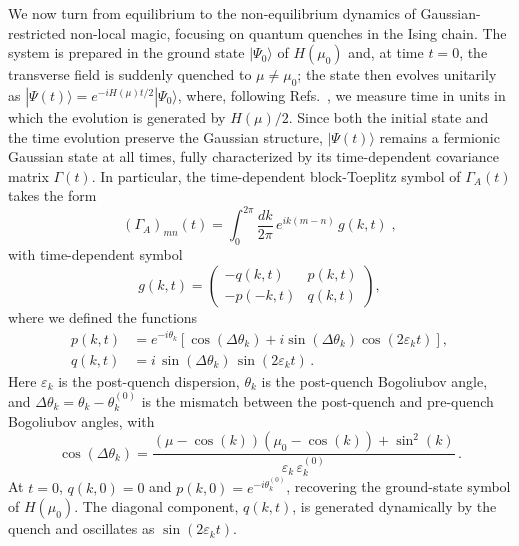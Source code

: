 \documentclass[prx,twocolumn,superscriptaddress,aps,10pt, frontmatterverbose, reprint,footinbib,longbibliography=true]{revtex4-2}
\providecommand{\DIFaddtex}[1]{{\protect\color{red}#1}} %
\providecommand{\DIFaddbegin}{\protect\color{red}} %
\providecommand{\DIFaddend}{\protect\color{black}} %
\providecommand{\DIFaddtex}[1]{\texorpdfstring{\DIFaddtex{#1}}{#1}} %
\providecommand{\DIFadd}[1]{\texorpdfstring{\DIFaddtex{#1}}{#1}} %
\newcommand{\DIFaddincludegraphics}[2][]{{\color{blue}\fbox{\DIFOincludegraphics[#1]{#2}}}} %
\DeclareRobustCommand{\DIFaddbegin}{\DIFOaddbegin \let\includegraphics\DIFaddincludegraphics} %
\DeclareRobustCommand{\DIFaddend}{\DIFOaddend \let\includegraphics\DIFOincludegraphics} %
\begin{document}
We now turn from equilibrium to the non-equilibrium dynamics of Gaussian-restricted non-local magic, focusing on quantum quenches in the Ising chain.
The system is prepared in the ground state $|\Psi_0\rangle$ of $H(\mu_0)$ and, at time $t=0$, the transverse field is suddenly quenched to $\mu \neq \mu_0$; the state then evolves unitarily as \DIFaddbegin \DIFadd{$|\Psi(t)\rangle = e^{-iH(\mu)t/2}|\Psi_0\rangle$, where, following Refs.~\cite{Calabrese2005evolution,Fagotti2008}, we measure time in units in which the evolution is generated by $H(\mu)/2$}\DIFaddend .
Since both the initial state and the time evolution preserve the Gaussian structure, $|\Psi(t)\rangle$ remains a fermionic Gaussian state at all times, fully characterized by its time-dependent covariance matrix $\Gamma(t)$.
In particular, the time-dependent block-Toeplitz symbol of $\Gamma_A(t)$ takes the form~\cite{Calabrese2005evolution}
\begin{equation}
    (\Gamma_A)_{mn}(t) = \int_0^{2\pi}\!\frac{dk}{2\pi}\,e^{ik(m-n)}\,g(k,t)\;,\label{eq:mustang}
\end{equation}
with time-dependent symbol
\begin{equation}
    g(k,t) = \begin{pmatrix} -q(k,t) & p(k,t) \\ -p(-k,t) & q(k,t) \end{pmatrix},
    \label{eq:symbol_t}
\end{equation}
where we defined the functions
\begin{equation}
\begin{split}
    p(k,t) &= e^{-i\theta_k}\left[\cos(\Delta\theta_k) + i\sin(\Delta\theta_k)\cos (2\varepsilon_k t) \right], \\
    q(k,t) &= i\,\sin(\Delta\theta_k)\,\sin (2\varepsilon_k t)\,.
    \label{eq:pq_symbol}
\end{split}
\end{equation}
Here $\varepsilon_k $ is the post-quench dispersion, $\theta_k$ is the post-quench Bogoliubov angle, and $\Delta\theta_k = \theta_k - \theta_k^{(0)}$ is the mismatch between the post-quench and pre-quench Bogoliubov angles, with
\begin{equation}
    \cos(\Delta\theta_k) = \frac{(\mu-\cos(k))(\mu_0-\cos (k))+\sin^2 (k)}{\varepsilon_k\,\varepsilon_k^{(0)}}\,.
    \label{eq:cos_delta_theta}
\end{equation}
At $t=0$, $q(k,0) = 0$ and $p(k,0) = e^{-i\theta_k^{(0)}}$, recovering the ground-state symbol of $H(\mu_0)$.
The diagonal component, $q(k,t)$, is generated dynamically by the quench and oscillates as $\sin(2\varepsilon_k t)$.
\end{document}

